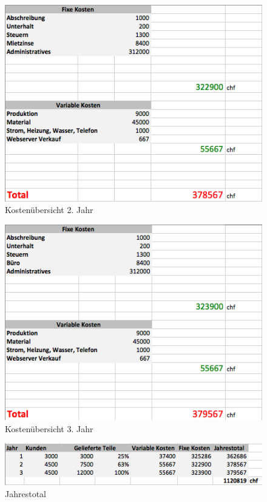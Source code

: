 \begin{figure}[H]
	\centering
		\includegraphics[scale=0.7]{bilder/Jahr2.png}
	\caption{Kosten\"ubersicht 2. Jahr}
	\label{fig:Jahr2}
\end{figure}
\begin{figure}[H]
	\centering
		\includegraphics[scale=0.7]{bilder/Jahr3.png}
	\caption{Kosten\"ubersicht 3. Jahr}
	\label{fig:Jahr3}
\end{figure}
\begin{figure}[H]
	\centering
		\includegraphics[scale=0.7]{bilder/kosten_ubersicht.png}
	\caption{Jahrestotal}
	\label{fig:Jahrestotal}
\end{figure}
